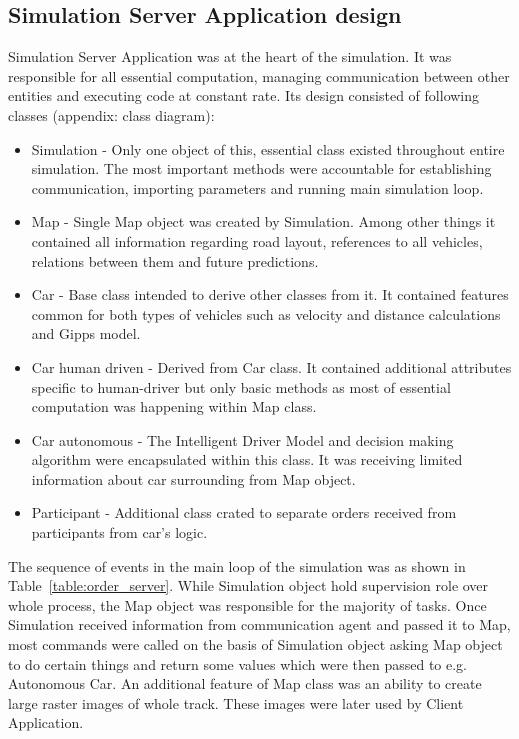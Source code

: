 \documentclass[11pt,english]{article}
\begin{document}
\subsection{Simulation Server Application design}


Simulation Server Application was at the heart of the simulation. It was responsible for all essential computation, managing communication between other entities and executing code at constant rate. Its design consisted of following classes (appendix: class diagram):

\begin{itemize}
\item Simulation - Only one object of this, essential class existed throughout entire simulation. The most important methods were accountable for establishing communication, importing parameters and running main simulation loop.
\item Map - Single Map object was created by Simulation. Among other things it contained all information regarding road layout, references to all vehicles, relations between them and future predictions. 
\item Car - Base class intended to derive other classes from it. It contained features common for both types of vehicles such as velocity and distance calculations and Gipps model.
\item Car human driven - Derived from Car class. It contained additional attributes specific to human-driver but only basic methods as most of essential computation was happening within Map class.
\item Car autonomous - The Intelligent Driver Model and decision making algorithm were encapsulated within this class. It was receiving limited information about car surrounding from Map object.
\item Participant - Additional class crated to separate orders received from participants from car's logic.
\end{itemize}


The sequence of events in the main loop of the simulation was as shown in Table~\ref{table:order_server}. While Simulation object hold supervision role over whole process, the Map object was responsible for the majority of tasks. Once Simulation received information from communication agent and passed it to Map, most commands were called on the basis of Simulation object asking Map object to do certain things and return some values which were then passed to e.g. Autonomous Car. An additional feature of Map class was an ability to create large raster images of whole track. These images were later used by Client Application.
\end{document}
